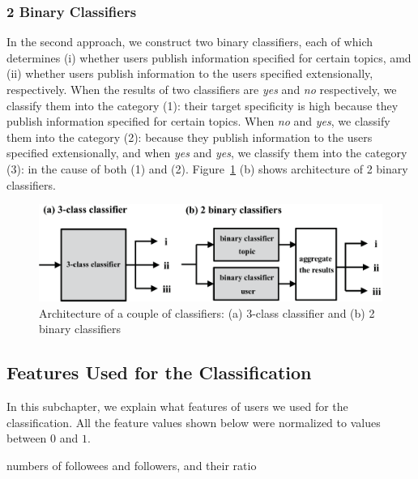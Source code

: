 \subsubsection{2 Binary Classifiers}
\label{subsubsec:2-binary}

In the second approach, we construct two binary classifiers, each of
which determines (i) whether users publish information specified for
certain topics, amd (ii) whether users publish information to the users
specified extensionally, respectively.  When the results of two
classifiers are \emph{yes} and \emph{no} respectively, we classify them
into the category (1): their target specificity is high because they
publish information specified for certain topics.  When \emph{no} and
\emph{yes}, we classify them into the category (2): because they publish
information to the users specified extensionally, and when \emph{yes}
and \emph{yes}, we classify them into the category (3): in the cause of
both (1) and (2).  Figure~\ref{fig:classifier} (b) shows architecture of
2 binary classifiers.

{\footnotesize
\begin{figure}[t]
\begin{center}
\includegraphics[width=14cm]{images/classifier.eps}
 \caption{Architecture of a couple of classifiers: (a) 3-class
 classifier and (b) 2 binary classifiers}
\label{fig:classifier}
\end{center}
\end{figure}
}

\subsection{Features Used for the Classification}
\label{subsec:Features}

In this subchapter, we explain what features of users we used for the
classification.  All the feature values shown below were normalized to
values between $0$ and $1$.

\begin{description}
\bf {\item[(i)] numbers of followees and followers, and their ratio}
\end{description}

